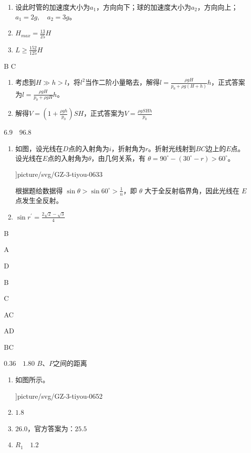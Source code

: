 \item \begin {enumerate} \item 设此时管的加速度大小为$ a_{1} $，方向向下；球的加速度大小为$ a_{2} $，方向向上；$a_{1}=2 g, \quad a_{2}=3 g$。 \item $H_{max}=\frac {13}{25} H$ \item $L \geq \frac {152}{125} H$ \end {enumerate}
\item B \quad C
\item \begin {enumerate} \item 考虑到$ H \gg h>l $，将$ l^{2} $当作二阶小量略去，解得$l=\frac {\rho g H}{p_{0}+\rho g (H+h)} h$，正式答案为$l=\frac {\rho g H}{p_{0}+\rho g H} h$。 \item 解得$V=\left ( 1+\frac {\rho g h}{p_{0}} \right ) S H$，正式答案为$V=\frac {\rho g S H h}{p_{0}}$ \end {enumerate}
\item $ 6.9 \quad 96.8 $
\item \begin {enumerate} \item 如图，设光线在$ D $点的入射角为$ i $，折射角为$ r $。折射光线射到$ BC $边上的$ E $点。设光线在$ E $点的入射角为$ \theta $，由几何关系，有 $\theta =90^{\circ }-\left (30^{\circ }-r\right )>60^{\circ }$。 \begin {center} \linewidth ]{picture/svg/GZ-3-tiyou-0633} \end {center} 根据题给数据得 $\sin \theta >\sin 60^{\circ }>\frac {1}{n}$，即 $\theta $ 大于全反射临界角，因此光线在 $E$ 点发生全反射。 \item $\sin r^{\prime }=\frac {2 \sqrt {2}-\sqrt {3}}{4}$ \end {enumerate}
\item B
\item A
\item D
\item B
\item C
\item AC
\item AD
\item BC
\item $ 0.36 \quad 1.80$ \quad $ B $、$ P $之间的距离
\item \begin {enumerate} \item 如图所示。 \begin {center} \linewidth ]{picture/svg/GZ-3-tiyou-0652} \end {center} \par \item $ 1.8 $ \item $ 26.0 $，官方答案为：$ 25.5 $ \item $ R_{1} \quad 1.2 $ \end {enumerate}
